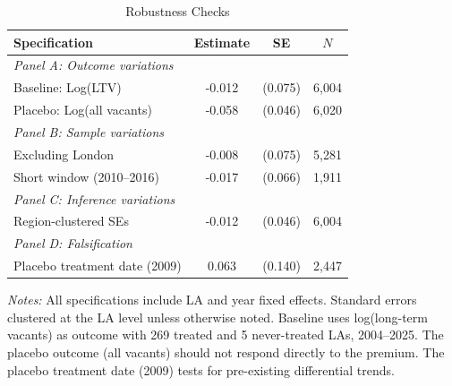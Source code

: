 \begin{table}[H]
\centering
\caption{Robustness Checks}
\begin{threeparttable}
\begin{tabular}{lccc}
\toprule
Specification & Estimate & SE & $N$ \\
\midrule
\multicolumn{4}{l}{\emph{Panel A: Outcome variations}} \\
Baseline: Log(LTV) & -0.012 & (0.075) & 6,004 \\
Placebo: Log(all vacants) & -0.058 & (0.046) & 6,020 \\
\midrule
\multicolumn{4}{l}{\emph{Panel B: Sample variations}} \\
Excluding London & -0.008 & (0.075) & 5,281 \\
Short window (2010--2016) & -0.017 & (0.066) & 1,911 \\
\midrule
\multicolumn{4}{l}{\emph{Panel C: Inference variations}} \\
Region-clustered SEs & -0.012 & (0.046) & 6,004 \\
\midrule
\multicolumn{4}{l}{\emph{Panel D: Falsification}} \\
Placebo treatment date (2009) & 0.063 & (0.140) & 2,447 \\
\bottomrule
\end{tabular}
\begin{tablenotes}[flushleft]
\small
\item \emph{Notes:} All specifications include LA and year fixed effects. Standard errors clustered at the LA level unless otherwise noted. Baseline uses log(long-term vacants) as outcome with 269 treated and 5 never-treated LAs, 2004--2025. The placebo outcome (all vacants) should not respond directly to the premium. The placebo treatment date (2009) tests for pre-existing differential trends.
\end{tablenotes}
\end{threeparttable}
\label{tab:robustness}
\end{table}

